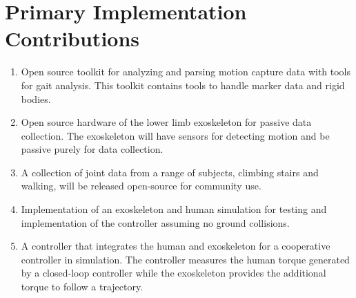 \section{Primary Implementation Contributions}
\begin{enumerate}[wide, nosep, labelindent = 0pt, topsep = 1ex]
    \item Open source toolkit for analyzing and parsing motion capture data with tools for gait analysis. This toolkit contains tools to handle marker data and rigid bodies.  
    \item Open source hardware of the lower limb exoskeleton for passive data collection. The exoskeleton will have sensors for detecting motion and be passive purely for data collection.
    \item A collection of joint data from a range of subjects, climbing stairs and walking, will be released open-source for community use.  
    \item  Implementation of an exoskeleton and human simulation for testing and implementation of the controller assuming no ground collisions.
    \item A controller that integrates the human and exoskeleton for a cooperative controller in simulation. The controller measures the human torque generated by a closed-loop controller while the exoskeleton provides the additional torque to follow a trajectory.  

\end{enumerate}